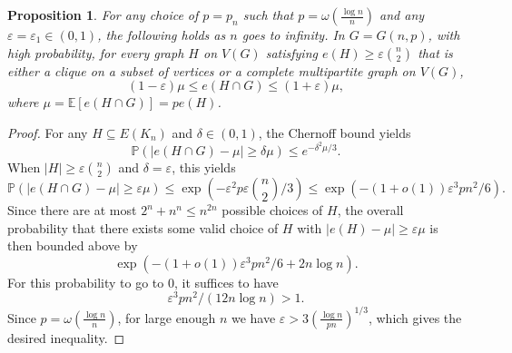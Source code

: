 \documentclass[12pt]{amsart}
\newtheorem{prop}[theorem]{Proposition}
\theoremstyle{definition}
\numberwithin{equation}{section}
\newcommand{\EE}{\mathbb{E}}
\newcommand{\PP}{\mathbb{P}}
\begin{document}
\begin{prop}
    \label{prop:density-control}
    For any choice of $p=p_n$ such that $p=\omega(\frac{\log n}{n})$ and any $\varepsilon=\varepsilon_1\in (0,1)$, the following holds as $n$ goes to infinity. 
     In $G=G(n, p)$, with high probability, for every graph $H$ on $V(G)$ satisfying $e(H)\ge \varepsilon \binom{n}{2}$ that is either a clique on a subset of vertices or a complete multipartite graph on $V(G)$,
    \[(1-\varepsilon)\mu \le e(H\cap G) \le (1+\varepsilon)\mu,\]
    where $\mu=\EE[e(H\cap G)]=pe(H)$.
\end{prop}
\begin{proof}
    For any $H\subseteq E(K_n)$ and $\delta\in (0,1)$, the Chernoff bound yields
    \[
    \PP(|e(H\cap G)-\mu|\ge \delta \mu) \le e^{-\delta^2 \mu/3}.
    \]
    When $|H|\ge \varepsilon \binom{n}{2}$ and $\delta=\varepsilon$, this yields
    \[
        \PP(|e(H\cap G)-\mu|\ge \varepsilon \mu) \le \exp(-\varepsilon^2 p \varepsilon \binom{n}{2}/3)\le \exp(-(1+o(1))\varepsilon^3 p n^2/6).
    \]
    Since there are at most $2^n+n^n\le n^{2n}$ possible choices of $H$, the overall probability that there exists some valid choice of $H$ with $|e(H)-\mu|\ge \varepsilon \mu$ is then bounded above by
    \[
        \exp(-(1+o(1))\varepsilon^3 p n^2/6+2n\log n).
    \]
    For this probability to go to $0$, it suffices to have
    \[
        \varepsilon^3 p n^2 / (12n\log n) > 1.
    \]
    Since $p=\omega(\frac{\log n}{n})$, for large enough $n$ we have $\varepsilon > 3(\frac{\log n}{pn})^{1/3}$, which gives the desired inequality.
\end{proof}
\end{document}
